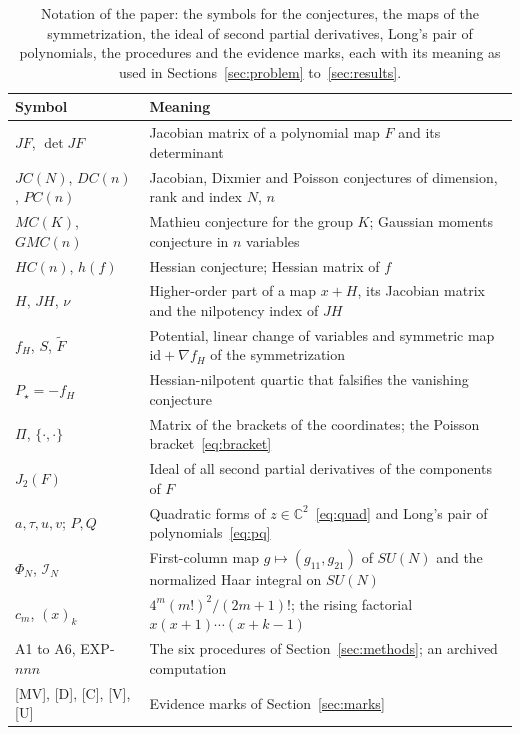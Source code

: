 \documentclass[11pt]{article}
\theoremstyle{remark}
\newcommand{\C}{\mathbb{C}}
\begin{document}
\begin{table}[t]
\centering\footnotesize
\setlength{\tabcolsep}{3pt}
\begin{tabular}{@{}L{0.27\textwidth}L{0.68\textwidth}@{}}
\toprule
Symbol & Meaning \\
\midrule
$JF$, $\det JF$ & Jacobian matrix of a polynomial map $F$ and its determinant \\
$JC(N)$, $DC(n)$, $PC(n)$ & Jacobian, Dixmier and Poisson conjectures of dimension, rank and index $N$, $n$ \\
$MC(K)$, $GMC(n)$ & Mathieu conjecture for the group $K$; Gaussian moments conjecture in $n$ variables \\
$HC(n)$, $h(f)$ & Hessian conjecture; Hessian matrix of $f$ \\
$H$, $JH$, $\nu$ & Higher-order part of a map $x+H$, its Jacobian matrix and the nilpotency index of $JH$ \\
$f_H$, $S$, $\widetilde F$ & Potential, linear change of variables and symmetric map $\mathrm{id}+\nabla f_H$ of the symmetrization \\
$P_\star=-f_H$ & Hessian-nilpotent quartic that falsifies the vanishing conjecture \\
$\Pi$, $\{\cdot,\cdot\}$ & Matrix of the brackets of the coordinates; the Poisson bracket~\eqref{eq:bracket} \\
$J_2(F)$ & Ideal of all second partial derivatives of the components of $F$ \\
$a,\tau,u,v$; $P,Q$ & Quadratic forms of $z\in\C^2$~\eqref{eq:quad} and Long's pair of polynomials~\eqref{eq:pq} \\
$\Phi_N$, $\mathcal I_N$ & First-column map $g\mapsto(g_{11},g_{21})$ of $SU(N)$ and the normalized Haar integral on $SU(N)$ \\
$c_m$, $(x)_k$ & $4^m(m!)^2/(2m+1)!$; the rising factorial $x(x+1)\cdots(x+k-1)$ \\
A1 to A6, EXP-$nnn$ & The six procedures of Section~\ref{sec:methods}; an archived computation \\
{[MV], [D], [C], [V], [U]} & Evidence marks of Section~\ref{sec:marks} \\
\bottomrule
\end{tabular}
\caption{Notation of the paper: the symbols for the conjectures, the maps of the symmetrization, the ideal of second partial derivatives, Long's pair of polynomials, the procedures and the evidence marks, each with its meaning as used in Sections~\ref{sec:problem} to~\ref{sec:results}.}
\label{tab:notation}
\end{table}
\end{document}
